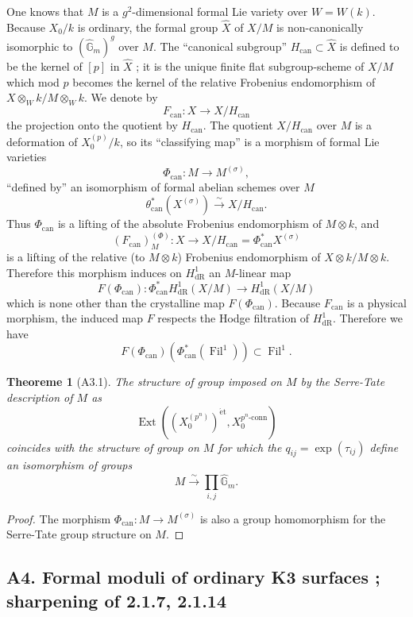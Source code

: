 \documentclass[12pt,a4paper]{article}
\theoremstyle{plain}
\newtheorem{theorem}{Theoreme}[section]
\theoremstyle{definition}
\theoremstyle{remark}
\DeclareMathOperator{\Fil}{Fil}
\DeclareMathOperator{\Ext}{Ext}
\providecommand{\Ext}{\operatorname{Ext}}
\begin{document}
One knows that $M$ is a $g^2$-dimensional formal Lie variety over $W = W(k)$. Because $X_0/k$ is ordinary, the formal group $\hat{X}$ of $X/M$ is non-canonically isomorphic to $(\hat{\mathbb{G}}_m)^g$ over $M$. The ``canonical subgroup'' $H_{\mathrm{can}} \subset \hat{X}$ is defined to be the kernel of $[p]$ in $\hat{X}$ ; it is the unique finite flat subgroup-scheme of $X/M$ which mod $p$ becomes the kernel of the relative Frobenius endomorphism of $X \otimes_W k/M \otimes_W k$. We denote by
\[
F_{\mathrm{can}} : X \longrightarrow X/H_{\mathrm{can}}
\]
the projection onto the quotient by $H_{\mathrm{can}}$. The quotient $X/H_{\mathrm{can}}$ over $M$ is a deformation of $X_0^{(p)}/k$, so its ``classifying map'' is a morphism of formal Lie varieties
\[
\Phi_{\mathrm{can}} : M \longrightarrow M^{(\sigma)},
\]
``defined by'' an isomorphism of formal abelian schemes over $M$
\[
\theta_{\mathrm{can}}^*(X^{(\sigma)}) \xrightarrow{\sim} X/H_{\mathrm{can}}.
\]
Thus $\Phi_{\mathrm{can}}$ is a lifting of the absolute Frobenius endomorphism of $M \otimes k$, and
\[
(F_{\mathrm{can}})_M^{(\Phi)} : X \longrightarrow X/H_{\mathrm{can}} = \Phi_{\mathrm{can}}^* X^{(\sigma)}
\]
is a lifting of the relative (to $M \otimes k$) Frobenius endomorphism of $X \otimes k/M \otimes k$. Therefore this morphism induces on $H^1_\mathrm{dR}$ an $M$-linear map
\[
F(\Phi_{\mathrm{can}}) : \Phi_{\mathrm{can}}^* H^1_\mathrm{dR}(X/M) \longrightarrow H^1_\mathrm{dR}(X/M)
\]
which is none other than the crystalline map $F(\Phi_{\mathrm{can}})$. Because $F_{\mathrm{can}}$ is a physical morphism, the induced map $F$ respects the Hodge filtration of $H^1_\mathrm{dR}$. Therefore we have
\[
F(\Phi_{\mathrm{can}})(\Phi_{\mathrm{can}}^*(\Fil^1)) \subset \Fil^1.
\]

\begin{theorem}[A3.1]
The structure of group imposed on $M$ by the Serre-Tate description of $M$ as
\[
\Ext((X_0^{(p^n)})^{\mathrm{\acute{e}t}}, X_0^{p^n\text{-}\mathrm{conn}})
\]
coincides with the structure of group on $M$ for which the $q_{ij} = \exp(\tau_{ij})$ define an isomorphism of groups
\[
M \xrightarrow{\sim} \prod_{i,j} \hat{\mathbb{G}}_m.
\]
\end{theorem}

\begin{proof}
The morphism $\Phi_{\mathrm{can}} : M \to M^{(\sigma)}$ is also a group homomorphism for the Serre-Tate group structure on $M$. \qedhere
\end{proof}

\subsection*{A4. Formal moduli of ordinary K3 surfaces ; sharpening of 2.1.7, 2.1.14}
\end{document}
